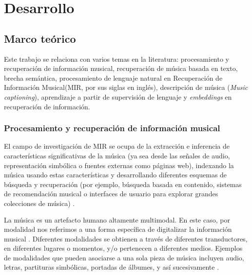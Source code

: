 \chapter{Desarrollo}
\label{chap:development} 

\section{Marco teórico}
\label{sec:sota}  
Este trabajo se relaciona con varios temas en la literatura: procesamiento y recuperación de información musical, recuperación de música basada en texto, brecha semántica, procesamiento de lenguaje natural en Recuperación de Información Musical(MIR, por sus siglas en inglés), descripción de música (\textit{Music captioning}), aprendizaje a partir de supervisión de lenguaje y \textit{embeddings} en recuperación de información.\\

\subsection{Procesamiento y recuperación de información musical}
\label{subsec:MIR}
El campo de investigación de MIR se ocupa de la extracción e inferencia de características significativas de la música (ya sea desde las señales de audio, representación simbólica o fuentes externas como páginas web), indexando la música usando estas características y desarrollando diferentes esquemas de búsqueda y recuperación (por ejemplo, búsqueda basada en contenido, sistemas de recomendación musical o interfaces de usuario para explorar grandes colecciones de música) \cite{Schedl2014MusicIR}.

La música es un artefacto humano altamente multimodal. En este caso, por modalidad nos referimos a una forma específica de digitalizar la información musical \cite{Simonetta2019MultimodalMI}. Diferentes modalidades se obtienen a través de diferentes transductores, en diferentes lugares o momentos, y/o pertenecen a diferentes medios. Ejemplos de modalidades que pueden asociarse a una sola pieza de música incluyen audio, letras, partituras simbólicas, portadas de álbumes, y así sucesivamente \cite{Simonetta2019MultimodalMI, Schedl2014MusicIR}.

